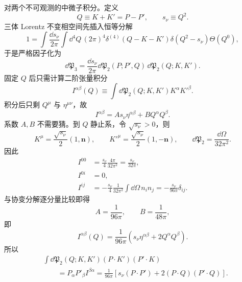 \begin{derivation}
对两个不可观测的中微子积分。定义
\begin{equation*}
Q\equiv K+K'=P-P',\qquad s_\nu\equiv Q^2.
\end{equation*}
三体 Lorentz 不变相空间先插入恒等分解
\[
1=\int\frac{\dd s_\nu}{2\pi}
\int\dd^4Q\,(2\pi)^4
\delta^{(4)}(Q-K-K')\delta(Q^2-s_\nu)\Theta(Q^0),
\]
于是严格因子化为
\begin{equation*}
\dd\mathfrak P_3
=\frac{\dd s_\nu}{2\pi}
\dd\mathfrak P_2(P;P',Q)\,
\dd\mathfrak P_2(Q;K,K').
\end{equation*}
固定 $Q$ 后只需计算二阶张量积分
\begin{equation*}
I^{\alpha\beta}(Q)
\equiv\int\dd\mathfrak P_2(Q;K,K')K^\alpha K'^\beta.
\end{equation*}
积分后只剩 $Q^\mu$ 与 $\eta^{\mu\nu}$，故
\begin{equation*}
I^{\alpha\beta}=A s_\nu\eta^{\alpha\beta}+B Q^\alpha Q^\beta.
\end{equation*}
系数 $A,B$ 不需要猜。到 $Q$ 静止系，令 $\sqrt{s_\nu}>0$，则
\begin{equation*}
K^\mu=\frac{\sqrt{s_\nu}}2(1,\mathbf n),\qquad
K'^\mu=\frac{\sqrt{s_\nu}}2(1,-\mathbf n),\qquad
\dd\mathfrak P_2=\frac{\dd\Omega}{32\pi^2}.
\end{equation*}
因此
\begin{align*}
I^{00}
&=\frac{s_\nu}{4}\frac{4\pi}{32\pi^2}
=\frac{s_\nu}{32\pi},\\
I^{0i}&=0,\\
I^{ij}
&=-\frac{s_\nu}{4}\frac{1}{32\pi^2}
\int\dd\Omega\,n_in_j
=-\frac{s_\nu}{96\pi}\delta_{ij}.
\end{align*}
与协变分解逐分量比较即得
\begin{equation*}
A=\frac1{96\pi},\qquad B=\frac1{48\pi},
\end{equation*}
即
\begin{equation*}
I^{\alpha\beta}(Q)
=\frac{1}{96\pi}
\left(s_\nu\eta^{\alpha\beta}+2Q^\alpha Q^\beta\right).
\end{equation*}
所以
\begin{align*}
&\int\dd\mathfrak P_2(Q;K,K')
(P\!\cdot K')(P'\!\cdot K)\\
&\qquad=P_\alpha P'_\beta I^{\beta\alpha}
=\frac{1}{96\pi}
\left[s_\nu(P\!\cdot P')+2(P\!\cdot Q)(P'\!\cdot Q)\right].
\end{align*}


\end{derivation}
